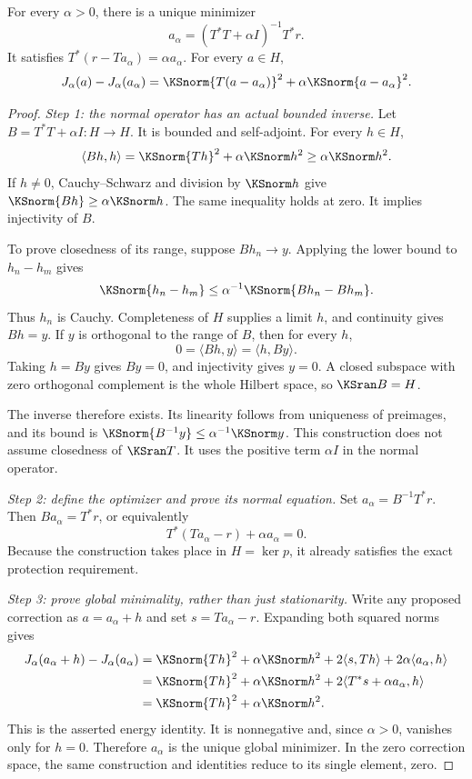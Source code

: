 \begin{KStheorem}\label{KS:WR06}
For every $\alpha>0$, there is a unique minimizer
\[
 a_\alpha=(T^*T+\alpha I)^{-1}T^*r.
\]
It satisfies $T^*(r-Ta_\alpha)=\alpha a_\alpha$. For every $a\in H$,
\begin{equation}\label{KS:eq:regularization-energy}
 J_\alpha(a)-J_\alpha(a_\alpha)
 =\KSnorm{T(a-a_\alpha)}^2+\alpha\KSnorm{a-a_\alpha}^2.
\end{equation}
\end{KStheorem}
\begin{proof}
\emph{Step 1: the normal operator has an actual bounded inverse.} Let $B=T^*T+\alpha I:H\to H$. It is bounded and self-adjoint. For every $h\in H$,
\[
 \langle Bh,h\rangle=\KSnorm{Th}^2+\alpha\KSnorm h^2
 \ge\alpha\KSnorm h^2.
\]
If $h\ne0$, Cauchy--Schwarz and division by $\KSnorm h$ give $\KSnorm{Bh}\ge\alpha\KSnorm h$. The same inequality holds at zero. It implies injectivity of $B$.

To prove closedness of its range, suppose $Bh_n\to y$. Applying the lower bound to $h_n-h_m$ gives
\[
 \KSnorm{h_n-h_m}\le\alpha^{-1}\KSnorm{Bh_n-Bh_m}.
\]
Thus $h_n$ is Cauchy. Completeness of $H$ supplies a limit $h$, and continuity gives $Bh=y$. If $y$ is orthogonal to the range of $B$, then for every $h$,
\[
 0=\langle Bh,y\rangle=\langle h,By\rangle.
\]
Taking $h=By$ gives $By=0$, and injectivity gives $y=0$. A closed subspace with zero orthogonal complement is the whole Hilbert space, so $\KSran B=H$.

The inverse therefore exists. Its linearity follows from uniqueness of preimages, and its bound is $\KSnorm{B^{-1}y}\le\alpha^{-1}\KSnorm y$. This construction does not assume closedness of $\KSran T$. It uses the positive term $\alpha I$ in the normal operator.

\emph{Step 2: define the optimizer and prove its normal equation.} Set $a_\alpha=B^{-1}T^*r$. Then $Ba_\alpha=T^*r$, or equivalently
\[
 T^*(Ta_\alpha-r)+\alpha a_\alpha=0.
\]
Because the construction takes place in $H=\ker p$, it already satisfies the exact protection requirement.

\emph{Step 3: prove global minimality, rather than just stationarity.} Write any proposed correction as $a=a_\alpha+h$ and set $s=Ta_\alpha-r$. Expanding both squared norms gives
\[
\begin{aligned}
 J_\alpha(a_\alpha+h)-J_\alpha(a_\alpha)
 &=\KSnorm{Th}^2+\alpha\KSnorm h^2
     +2\langle s,Th\rangle+2\alpha\langle a_\alpha,h\rangle\\
 &=\KSnorm{Th}^2+\alpha\KSnorm h^2
     +2\langle T^*s+\alpha a_\alpha,h\rangle\\
 &=\KSnorm{Th}^2+\alpha\KSnorm h^2.
\end{aligned}
\]
This is the asserted energy identity. It is nonnegative and, since $\alpha>0$, vanishes only for $h=0$. Therefore $a_\alpha$ is the unique global minimizer. In the zero correction space, the same construction and identities reduce to its single element, zero.
\end{proof}


